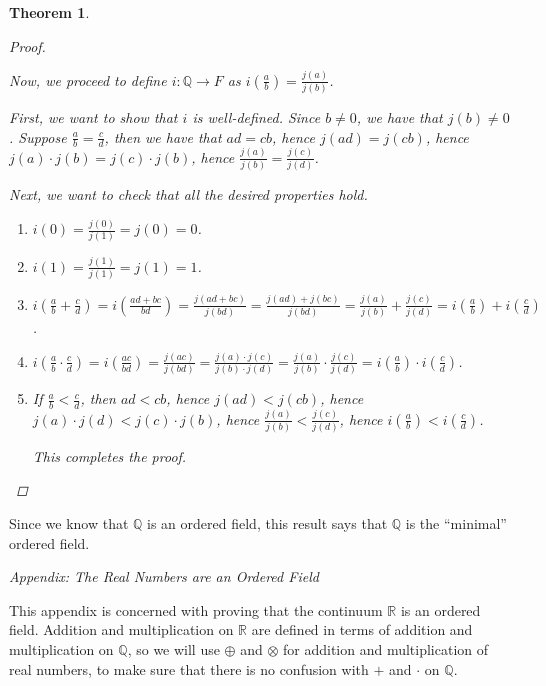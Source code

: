 \documentclass[11pt]{article}
\newcommand{\bbQ}{\mathbb{Q}}
\newcommand{\bbR}{\mathbb{R}}
\newtheorem{theorem}{Theorem}[section]
\theoremstyle{definition}
\numberwithin{equation}{subsection}
\begin{document}
\begin{theorem}
\begin{proof}
\begin{enumerate}
\end{enumerate}

Now, we proceed to define $i \colon \bbQ \rightarrow F$ as $i(\frac{a}{b})=\frac{j(a)}{j(b)}$.

First, we want to show that $i$ is well-defined. Since $b \neq 0$, we have that $j(b) \neq 0$. Suppose $\frac{a}{b}=\frac{c}{d}$, then we have that $ad=cb$, hence $j(ad)=j(cb)$, hence $j(a)\cdot j(b)=j(c) \cdot j(b)$, hence $\frac{j(a)}{j(b)}=\frac{j(c)}{j(d)}$.

Next, we want to check that all the desired properties hold.

\begin{enumerate}
\item 
$i(0)=\frac{j(0)}{j(1)}=j(0)=0$.

\item 
$i(1)=\frac{j(1)}{j(1)}=j(1)=1$.

\item 
$i(\frac{a}{b}+\frac{c}{d})=i(\frac{ad+bc}{bd})= \frac{j(ad+bc)}{j(bd)}=\frac{j(ad)+j(bc)}{j(bd)}=\frac{j(a)}{j(b)}+\frac{j(c)}{j(d)}=i(\frac{a}{b}) + i(\frac{c}{d})$. 

\item 
$i(\frac{a}{b}\cdot \frac{c}{d})=i(\frac{ac}{bd})= \frac{j(ac)}{j(bd)}=\frac{j(a)\cdot j(c)}{j(b)\cdot j(d)}=\frac{j(a)}{j(b)}\cdot \frac{j(c)}{j(d)}=i(\frac{a}{b}) \cdot i(\frac{c}{d})$. 

\item 
If $\frac{a}{b}<\frac{c}{d}$, then $ad<cb$, hence $j(ad)<j(cb)$, hence $j(a) \cdot j(d) < j(c) \cdot j(b)$, hence $\frac{j(a)}{j(b)}<\frac{j(c)}{j(d)}$, hence $i(\frac{a}{b})<i(\frac{c}{d})$.

This completes the proof.

\end{enumerate}




\renewcommand\qedsymbol{QED}
\end{proof}

\end{theorem}


Since we know that $\bbQ$ is an ordered field, this result says that $\bbQ$ is the ``minimal'' ordered field.\bigskip


\begin{center}
{\em Appendix: The Real Numbers are an Ordered Field}
\end{center} 
This appendix is concerned with proving that the continuum $\bbR$ is an ordered field.  Addition and multiplication on $\bbR$ are defined in terms of addition and multiplication on $\bbQ$, so we will use $\oplus$ and $\otimes$ for addition and multiplication of real numbers, to make sure that there is no confusion with $+$ and $\cdot$ on $\bbQ$.
\end{document}
